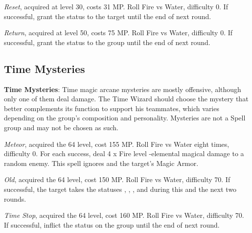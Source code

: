 \begin{multicols}{2}
    \textit{Reset}, acquired at level 30, costs 31 MP\@. Roll Fire vs Water, difficulty 0. If successful, grant the  status to the target until the end of next round.
    
    \textit{Return}, acquired at level 50, costs 75 MP\@. Roll Fire vs Water, difficulty 0. If successful, grant the  status to the group until the end of next round.
    
    \subsection{Time Mysteries}\label{subsec:time-mysteries}

    \textbf{Time Mysteries}: Time magic arcane mysteries are mostly offensive, although only one of them deal damage. The Time Wizard should choose the mystery that better complements its function to support his teammates, which varies depending on the group’s composition and personality. Mysteries are not a Spell group and may not be chosen as such.
    
    \textit{Meteor}, acquired the 64 level, cost 155 MP\@. Roll Fire vs Water eight times, difficulty 0. For each success, deal 4 x Fire level -elemental magical damage to a random enemy. This spell ignores  and the target’s Magic Armor.
    
    \textit{Old}, acquired the 64 level, cost 150 MP\@. Roll Fire vs Water, difficulty 70. If successful, the target takes the statuses , , ,  and  during this and the next two rounds.
    
    \textit{Time Stop}, acquired the 64 level, cost 160 MP\@. Roll Fire vs Water, difficulty 70. If successful, inflict the  status on the group until the end of next round.

\end{multicols}

